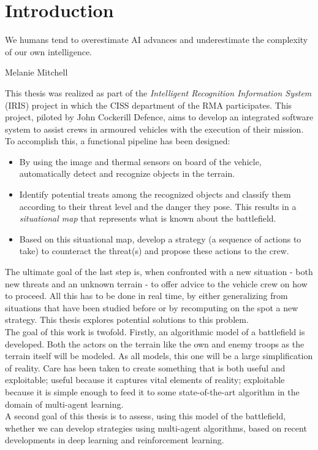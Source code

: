 \chapter{Introduction}

\epigraph{We humans tend to overestimate AI advances and underestimate the complexity of our own intelligence.} {Melanie Mitchell}
This thesis was realized as part of the \emph{Intelligent Recognition Information System} (IRIS) project in which the CISS department of the RMA participates. This project, piloted by John Cockerill Defence, aims to develop an integrated software system to assist crews in armoured vehicles with the execution of their mission. To accomplish this, a functional pipeline has been designed:
\begin{itemize}
    \item By using the image and thermal sensors on board of the vehicle, automatically detect and recognize objects in the terrain.
    \item Identify potential treats among the recognized objects and classify them according to their threat level and the danger they pose. This results in a \emph{situational map} that represents what is known about the battlefield.
    \item Based on this situational map, develop a strategy (a sequence of actions to take) to counteract the threat(s) and propose these actions to the crew.
\end{itemize}
The ultimate goal of the last step is, when confronted with a new situation - both new threats and an unknown terrain - to offer advice to the vehicle crew on how to proceed. All this has to be done in real time, by either generalizing from situations that have been studied before or by recomputing on the spot a new strategy. This thesis explores potential solutions to this problem.\\
The goal of this work is twofold. Firstly, an algorithmic model of a battlefield is developed. Both the actors on the terrain like the own and enemy troops as the terrain itself will be modeled. As all models, this one will be a large simplification of reality. Care has been taken to create something that is both useful and exploitable; useful because it captures vital elements of reality; exploitable because it is simple enough to feed it to some state-of-the-art algorithm in the domain of multi-agent learning.\\
A second goal of this thesis is to assess, using this model of the battlefield, whether we can develop strategies using multi-agent algorithms, based on recent developments in deep learning and reinforcement learning.\\
